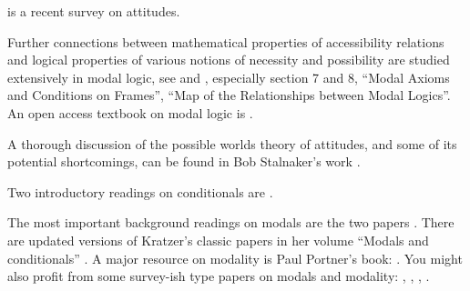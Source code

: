 \cite{swanson-2011-hsk-attitudes} is a recent survey on attitudes.

Further connections between mathematical properties of accessibility relations
and logical properties of various notions of necessity and possibility are
studied extensively in modal logic, see \cite{hughes-cresswell-1996-new} and
\cite{garson-2018-sep-logic-modal}, especially section 7 and 8, ``Modal Axioms
and Conditions on Frames'', ``Map of the Relationships between Modal Logics''. 
%
An open access textbook on modal logic is \cite{zach-2019-open-modal}.

A thorough discussion of the possible worlds theory of attitudes, and some of
its potential shortcomings, can be found in Bob Stalnaker's work
\citeyearpar{stalnaker-1984-inquiry,stalnaker-1999-contextandcontent}.

Two introductory readings on conditionals are
\cite{fintel-2011-hsk-conditionals,fintel-2012-subjunctives}.

The most important background readings on modals are the two papers
\cite{kratzer-1981-notional,kratzer-1991-modality}. There are updated versions
of Kratzer's classic papers in her volume ``Modals and conditionals''
\parencite{kratzer-2012-book}. A major resource on modality is Paul
Portner's book: \cite{portner-2009-modality-book}. You might also profit from
some survey-ish type papers on modals and modality: \cite{fintel-2005-modality},
\cite{fintel-gillies-2007-ose2}, \cite{swanson-2008-modality},
\cite{hacquard-2009-hsk-modality}.


